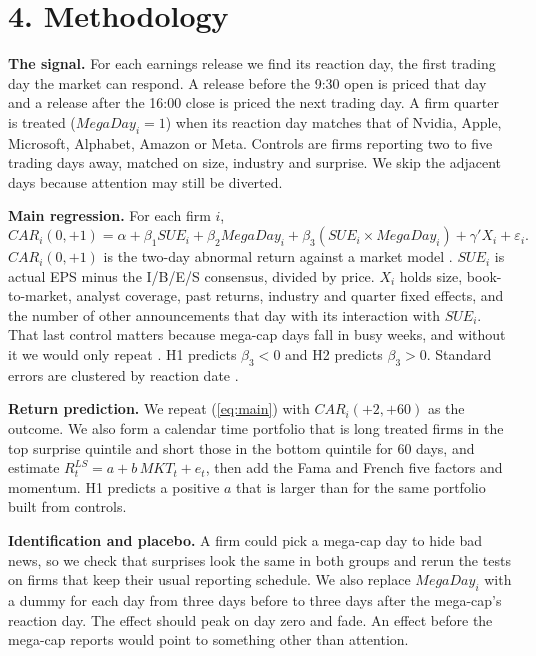 \documentclass[11pt]{article}
\newcommand{\CAR}{\mathit{CAR}}
\newcommand{\SUE}{\mathit{SUE}}
\newcommand{\Treat}{\mathit{MegaDay}}
\begin{document}
\section*{4. Methodology}

\textbf{The signal.} For each earnings release we find its reaction day, the first trading day the market can respond. A release before the 9:30 open is priced that day and a release after the 16:00 close is priced the next trading day. A firm quarter is treated ($\Treat_i = 1$) when its reaction day matches that of Nvidia, Apple, Microsoft, Alphabet, Amazon or Meta. Controls are firms reporting two to five trading days away, matched on size, industry and surprise. We skip the adjacent days because attention may still be diverted.

\textbf{Main regression.} For each firm $i$,
\begin{equation}
  \CAR_{i}(0,+1) = \alpha + \beta_1 \SUE_i + \beta_2 \Treat_i + \beta_3 \left(\SUE_i \times \Treat_i\right) + \gamma' X_i + \varepsilon_i .
  \label{eq:main}
\end{equation}
$\CAR_i(0,+1)$ is the two-day abnormal return against a market model \citep{mackinlay1997event}. $\SUE_i$ is actual EPS minus the I/B/E/S consensus, divided by price. $X_i$ holds size, book-to-market, analyst coverage, past returns, industry and quarter fixed effects, and the number of other announcements that day with its interaction with $\SUE_i$. That last control matters because mega-cap days fall in busy weeks, and without it we would only repeat \citet{hirshleifer2009driven}. H1 predicts $\beta_3 < 0$ and H2 predicts $\beta_3 > 0$. Standard errors are clustered by reaction date \citep{petersen2009estimating}.

\textbf{Return prediction.} We repeat (\ref{eq:main}) with $\CAR_i(+2,+60)$ as the outcome. We also form a calendar time portfolio that is long treated firms in the top surprise quintile and short those in the bottom quintile for 60 days, and estimate $R^{LS}_t = a + b\,\mathit{MKT}_t + e_t$, then add the Fama and French five factors and momentum. H1 predicts a positive $a$ that is larger than for the same portfolio built from controls.

\textbf{Identification and placebo.} A firm could pick a mega-cap day to hide bad news, so we check that surprises look the same in both groups and rerun the tests on firms that keep their usual reporting schedule. We also replace $\Treat_i$ with a dummy for each day from three days before to three days after the mega-cap's reaction day. The effect should peak on day zero and fade. An effect before the mega-cap reports would point to something other than attention.
\end{document}
